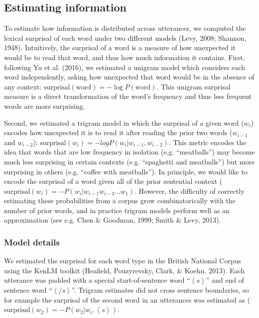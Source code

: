 \documentclass[10pt, letterpaper]{article}
\begin{document}
\hypertarget{estimating-information}{%
\subsection{Estimating information}\label{estimating-information}}

To estimate how information is distributed across utterances, we
computed the lexical surprisal of each word under two different models
(Levy, 2008; Shannon, 1948). Intuitively, the surprisal of a word is a
measure of how unexpected it would be to read that word, and thus how
much information it contains. First, following Yu et al. (2016), we
estimated a unigram model which considers each word independently,
asking how unexpected that word would be in the absence of any context:
\(\text{surprisal}(\text{word}) = -\log P(\text{word})\). This unigram
surprisal measure is a direct transformation of the word's frequency and
thus less frequent words are more surprising.

Second, we estimated a trigram model in which the surprisal of a given
word (\(w_i\)) encodes how unexpected it is to read it after reading the
prior two words (\(w_{i-1}\) and \(w_{i-2}\)):
\(\text{surprisal}(w_{i}) = -log P(w_i|w_{i-1},w_{i-2})\). This metric
encodes the idea that words that are low frequency in isolation (e.g.
``meatballs'') may become much less surprising in certain contexts (e.g.
``spaghetti and meatballs'') but more surprising in others (e.g.
``coffee with meatballs''). In principle, we would like to encode the
surprisal of a word given all of the prior sentential context
(\(\text{surprisal}(w_{i}) = -P(w_i|w_{i-1}w_{i-2}...w_{1})\). However,
the difficulty of correctly estimating these probabilities from a corpus
grow combinatorically with the number of prior words, and in practice
trigram models perform well as an approximation (see e.g. Chen \&
Goodman, 1999; Smith \& Levy, 2013).

\hypertarget{model-details}{%
\subsubsection{Model details}\label{model-details}}

We estimated the surprisal for each word type in the British National
Corpus using the KenLM toolkit (Heafield, Pouzyrevsky, Clark, \& Koehn,
2013). Each utterance was padded with a special start-of-sentence word
``\(\left<s\right>\)'' and end of sentence word ``\(\left</s\right>\)''.
Trigram estimates did not cross sentence boundaries, so for example the
surprisal of the second word in an utterances was estimated as
(\(\text{surprisal}(w_{2}) = -P(w_2|w_{i},\left<s\right>)\).
\end{document}
